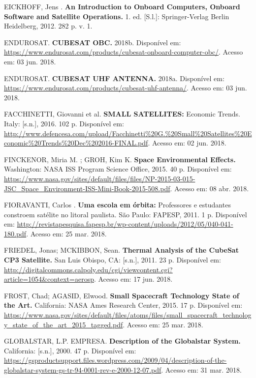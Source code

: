 \noindent EICKHOFF, Jens . \textbf{An Introduction to Onboard Computers, Onboard Software and Satellite Operations.} 1. ed. [S.l.]: Springer-Verlag Berlin Heidelberg, 2012. 282 p. v. 1.

\noindent ENDUROSAT. \textbf{CUBESAT OBC. } 2018b. Disponível em: \url{https://www.endurosat.com/products/cubesat-onboard-computer-obc/}. Acesso em: 03 jun. 2018.

\noindent ENDUROSAT. \textbf{CUBESAT UHF ANTENNA. } 2018a. Disponível em: \url{https://www.endurosat.com/products/cubesat-uhf-antenna/}. Acesso em: 03 jun. 2018.

\noindent FACCHINETTI, Giovanni et al. \textbf{SMALL SATELLITES: } Economic Trends. Italy: [s.n.], 2016. 102 p. Disponível em: \url{http://www.defencesa.com/upload/Facchinetti\%20G.\%20Small\%20Satellites\%20Economic\%20Trends\%20Dec\%202016-FINAL.pdf}. Acesso em: 02 jun. 2018.

\noindent FINCKENOR, Miria M. ; GROH, Kim K. \textbf{Space Environmental Effects. } Washington: NASA ISS Program Science Office, 2015. 40 p. Disponível em: \url{https://www.nasa.gov/sites/default/files/files/NP-2015-03-015-JSC_Space_Environment-ISS-Mini-Book-2015-508.pdf}. Acesso em: 08 abr. 2018.

\noindent FIORAVANTI, Carlos . \textbf{Uma escola em órbita: } Professores e estudantes constroem satélite no litoral paulista. São Paulo: FAPESP, 2011. 1 p. Disponível em: \url{http://revistapesquisa.fapesp.br/wp-content/uploads/2012/05/040-041-180.pdf}. Acesso em: 25 mar. 2018.

\noindent FRIEDEL, Jonas; MCKIBBON, Sean. \textbf{Thermal Analysis of the CubeSat CP3 Satellite. } San Luis Obispo, CA: [s.n.], 2011. 23 p. Disponível em: \url{http://digitalcommons.calpoly.edu/cgi/viewcontent.cgi?article=1054&context=aerosp}. Acesso em: 17 jun. 2018.

\noindent FROST, Chad; AGASID, Elwood. \textbf{Small Spacecraft Technology State of the Art. } California: NASA Ames Research Center, 2015. 17 p. Disponível em: \url{https://www.nasa.gov/sites/default/files/atoms/files/small_spacecraft_technology_state_of_the_art_2015_tagged.pdf}. Acesso em: 25 mar. 2018.

\noindent GLOBALSTAR, L.P. EMPRESA. \textbf{Description of the Globalstar System. } California: [s.n.], 2000. 47 p. Disponível em: \url{https://gsproductsupport.files.wordpress.com/2009/04/description-of-the-globalstar-system-gs-tr-94-0001-rev-e-2000-12-07.pdf}. Acesso em: 31 mar. 2018.

